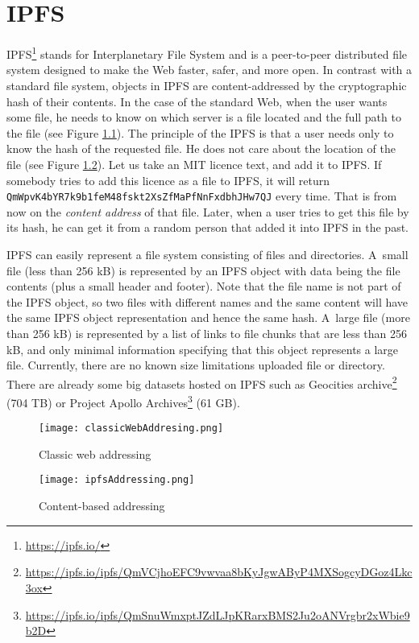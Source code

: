 \chapter{IPFS}
\label{ipfs}

IPFS\footnote{\url{https://ipfs.io/}} stands for Interplanetary File System and is a peer-to-peer distributed file system designed to make the Web faster, safer, and more open. In contrast with a standard file system, objects in IPFS are content-addressed by the cryptographic hash of their contents. In the case of the standard Web, when the user wants some file, he needs to know on which server is a file located and the full path to the file (see Figure \ref{webAddressing}). The principle of the IPFS is that a user needs only to know the hash of the requested file. He does not care about the location of the file (see Figure \ref{ipfsAddressing}). Let us take an MIT licence text, and add it to IPFS. If somebody tries to add this licence as a file to IPFS, it will return \texttt{QmWpvK4bYR7k9b1feM48fsk\-t2XsZfMaPfNnFxdbhJHw7QJ} every time. That is from now on the \textit{content address} of that file. Later, when a user tries to get this file by its hash, he can get it from a random person that added it into IPFS in the past.

IPFS can easily represent a file system consisting of files and directories. A~small file (less than 256 kB) is represented by an IPFS object with data being the file contents (plus a small header and footer). Note that the file name is not part of the IPFS object, so two files with different names and the same content will have the same IPFS object representation and hence the same hash. A~large file (more than 256 kB) is represented by a list of links to file chunks that are less than 256 kB, and only minimal information specifying that this object represents a large file. Currently, there are no known size limitations uploaded file or directory. There are already some big datasets hosted on IPFS such as Geocities archive\footnote{\url{https://ipfs.io/ipfs/QmVCjhoEFC9vwvaa8bKyJgwAByP4MXSogcyDGoz4Lkc3ox}} (704 TB) or Project Apollo Archives\footnote{\url{https://ipfs.io/ipfs/QmSnuWmxptJZdLJpKRarxBMS2Ju2oANVrgbr2xWbie9b2D}} (61 GB).


\begin{figure}[h]
    \centering
    \texttt{[image: classicWebAddresing.png]}
    \caption{Classic web addressing}
    \label{webAddressing}
\end{figure}

\begin{figure}[h]
    \centering
    \texttt{[image: ipfsAddressing.png]}
    \caption{Content-based addressing}
    \label{ipfsAddressing}
\end{figure}

